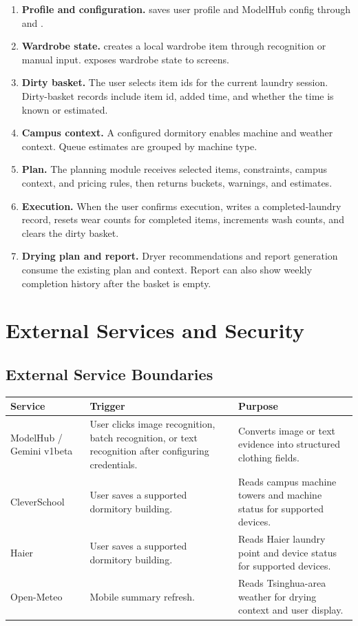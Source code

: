 \documentclass[11pt,a4paper]{article}
\begin{document}
\begin{enumerate}
  \item \textbf{Profile and configuration.}  saves user profile and ModelHub config through  and .
  \item \textbf{Wardrobe state.}  creates a local wardrobe item through recognition or manual input.  exposes wardrobe state to screens.
  \item \textbf{Dirty basket.} The user selects item ids for the current laundry session. Dirty-basket records include item id, added time, and whether the time is known or estimated.
  \item \textbf{Campus context.} A configured dormitory enables machine and weather context. Queue estimates are grouped by machine type.
  \item \textbf{Plan.} The planning module receives selected items, constraints, campus context, and pricing rules, then returns buckets, warnings, and estimates.
  \item \textbf{Execution.} When the user confirms execution,  writes a completed-laundry record, resets wear counts for completed items, increments wash counts, and clears the dirty basket.
  \item \textbf{Drying plan and report.} Dryer recommendations and report generation consume the existing plan and context. Report can also show weekly completion history after the basket is empty.
\end{enumerate}

\section{External Services and Security}

\subsection{External Service Boundaries}

\begin{longtable}{p{} p{} p{}}
\toprule
Service & Trigger & Purpose \\
\midrule
ModelHub / Gemini v1beta & User clicks image recognition, batch recognition, or text recognition after configuring credentials. & Converts image or text evidence into structured clothing fields. \\
CleverSchool & User saves a supported dormitory building. & Reads campus machine towers and machine status for supported devices. \\
Haier & User saves a supported dormitory building. & Reads Haier laundry point and device status for supported devices. \\
Open-Meteo & Mobile summary refresh. & Reads Tsinghua-area weather for drying context and user display. \\
\bottomrule
\end{longtable}
\end{document}
